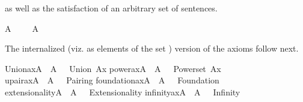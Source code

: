 as well as the satisfaction of an arbitrary set of sentences.%
\begin{isabelle}%
A\ {\isasymTurnstile}\ {\isasymPhi}\ {\isasymequiv}\ {\isasymforall}{\isasymphi}{\isasymin}{\isasymPhi}{\isachardot}{\kern0pt}\ A{\isacharcomma}{\kern0pt}\ {\isacharbrackleft}{\kern0pt}{\isacharbrackright}{\kern0pt}\ {\isasymTurnstile}\ {\isasymphi}%
\end{isabelle}%
The internalized (viz. as elements of the set )
    version of the axioms follow next.%
\begin{isabelle}%
Union{\isacharunderscore}{\kern0pt}ax{\isacharparenleft}{\kern0pt}{\isacharhash}{\kern0pt}{\isacharhash}{\kern0pt}A{\isacharparenright}{\kern0pt}\ {\isasymlongleftrightarrow}\ A{\isacharcomma}{\kern0pt}\ {\isacharbrackleft}{\kern0pt}{\isacharbrackright}{\kern0pt}\ {\isasymTurnstile}\ {\isasymcdot}Union\ Ax{\isasymcdot}\isasep\isanewline%
power{\isacharunderscore}{\kern0pt}ax{\isacharparenleft}{\kern0pt}{\isacharhash}{\kern0pt}{\isacharhash}{\kern0pt}A{\isacharparenright}{\kern0pt}\ {\isasymlongleftrightarrow}\ A{\isacharcomma}{\kern0pt}\ {\isacharbrackleft}{\kern0pt}{\isacharbrackright}{\kern0pt}\ {\isasymTurnstile}\ {\isasymcdot}Powerset\ Ax{\isasymcdot}\isasep\isanewline%
upair{\isacharunderscore}{\kern0pt}ax{\isacharparenleft}{\kern0pt}{\isacharhash}{\kern0pt}{\isacharhash}{\kern0pt}A{\isacharparenright}{\kern0pt}\ {\isasymlongleftrightarrow}\ A{\isacharcomma}{\kern0pt}\ {\isacharbrackleft}{\kern0pt}{\isacharbrackright}{\kern0pt}\ {\isasymTurnstile}\ {\isasymcdot}Pairing{\isasymcdot}\isasep\isanewline%
foundation{\isacharunderscore}{\kern0pt}ax{\isacharparenleft}{\kern0pt}{\isacharhash}{\kern0pt}{\isacharhash}{\kern0pt}A{\isacharparenright}{\kern0pt}\ {\isasymlongleftrightarrow}\ A{\isacharcomma}{\kern0pt}\ {\isacharbrackleft}{\kern0pt}{\isacharbrackright}{\kern0pt}\ {\isasymTurnstile}\ {\isasymcdot}Foundation{\isasymcdot}\isasep\isanewline%
extensionality{\isacharparenleft}{\kern0pt}{\isacharhash}{\kern0pt}{\isacharhash}{\kern0pt}A{\isacharparenright}{\kern0pt}\ {\isasymlongleftrightarrow}\ A{\isacharcomma}{\kern0pt}\ {\isacharbrackleft}{\kern0pt}{\isacharbrackright}{\kern0pt}\ {\isasymTurnstile}\ {\isasymcdot}Extensionality{\isasymcdot}\isasep\isanewline%
infinity{\isacharunderscore}{\kern0pt}ax{\isacharparenleft}{\kern0pt}{\isacharhash}{\kern0pt}{\isacharhash}{\kern0pt}A{\isacharparenright}{\kern0pt}\ {\isasymlongleftrightarrow}\ A{\isacharcomma}{\kern0pt}\ {\isacharbrackleft}{\kern0pt}{\isacharbrackright}{\kern0pt}\ {\isasymTurnstile}\ {\isasymcdot}Infinity{\isasymcdot}\isasep\isanewline\isanewline%

\end{isabelle}
